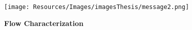 \begin{frame}

\vspace{2.5cm}
\centering
\texttt{[image: Resources/Images/imagesThesis/message2.png]}
\end{frame}
\clearpage

\begin{frame}
    \vspace{4cm}
\centering
{\Huge\textbf{Flow Characterization}}
\end{frame}


